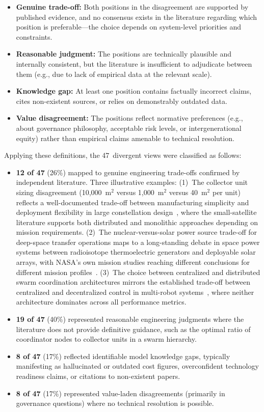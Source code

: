 \documentclass[11pt,a4paper]{article}
\begin{document}
\begin{itemize}[nosep]
    \item \textbf{Genuine trade-off:} Both positions in the disagreement are supported by published evidence, and no consensus exists in the literature regarding which position is preferable---the choice depends on system-level priorities and constraints.
    \item \textbf{Reasonable judgment:} The positions are technically plausible and internally consistent, but the literature is insufficient to adjudicate between them (e.g., due to lack of empirical data at the relevant scale).
    \item \textbf{Knowledge gap:} At least one position contains factually incorrect claims, cites non-existent sources, or relies on demonstrably outdated data.
    \item \textbf{Value disagreement:} The positions reflect normative preferences (e.g., about governance philosophy, acceptable risk levels, or intergenerational equity) rather than empirical claims amenable to technical resolution.
\end{itemize}

Applying these definitions, the 47~divergent views were classified as follows:

\begin{itemize}[nosep]
    \item \textbf{12 of 47} (26\%) mapped to genuine engineering trade-offs confirmed by independent literature. Three illustrative examples: (1)~The collector unit sizing disagreement (10{,}000~m$^2$ versus 1{,}000~m$^2$ versus 40~m$^2$ per unit) reflects a well-documented trade-off between manufacturing simplicity and deployment flexibility in large constellation design~\cite{barnhart2007smallsat}, where the small-satellite literature supports both distributed and monolithic approaches depending on mission requirements. (2)~The nuclear-versus-solar power source trade-off for deep-space transfer operations maps to a long-standing debate in space power systems between radioisotope thermoelectric generators and deployable solar arrays, with NASA's own mission studies reaching different conclusions for different mission profiles~\cite{nasa2020se}. (3)~The choice between centralized and distributed swarm coordination architectures mirrors the established trade-off between centralized and decentralized control in multi-robot systems~\cite{brambilla2013swarm}, where neither architecture dominates across all performance metrics.
    \item \textbf{19 of 47} (40\%) represented reasonable engineering judgments where the literature does not provide definitive guidance, such as the optimal ratio of coordinator nodes to collector units in a swarm hierarchy.
    \item \textbf{8 of 47} (17\%) reflected identifiable model knowledge gaps, typically manifesting as hallucinated or outdated cost figures, overconfident technology readiness claims, or citations to non-existent papers.
    \item \textbf{8 of 47} (17\%) represented value-laden disagreements (primarily in governance questions) where no technical resolution is possible.
\end{itemize}
\end{document}
